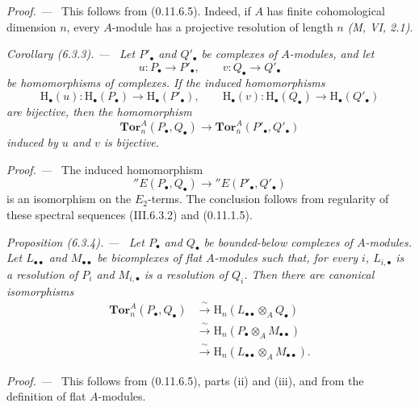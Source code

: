 \documentclass[10pt,oneside]{book}
\newcommand{\HH}{\mathrm H}
\newcommand{\sref}[2][]{(#2)}
\newenvironment{proposition}[1][]{\par\medskip\noindent\itshape Proposition (#1). ---\ }{\par}
\newenvironment{corollary}[1][]{\par\medskip\noindent\itshape Corollary (#1). ---\ }{\par}
\newenvironment{proof}{\par\medskip\noindent\textit{Proof. ---\ }}{\par}
\begin{document}
\begin{proof}
This follows from \sref[0]{0.11.6.5}.  Indeed, if $A$ has finite
cohomological dimension $n$, every $A$-module has a projective
resolution of length $n$ \emph{(M, VI, 2.1)}.
\end{proof}

\begin{corollary}[6.3.3]
\label{III.6.3.3}
Let $P'_\bullet$ and $Q'_\bullet$ be complexes of $A$-modules, and
let
\[
  u:P_\bullet\to P'_\bullet,
  \qquad
  v:Q_\bullet\to Q'_\bullet
\]
be homomorphisms of complexes.  If the induced homomorphisms
\[
  \HH_\bullet(u):
  \HH_\bullet(P_\bullet)\longrightarrow\HH_\bullet(P'_\bullet),
  \qquad
  \HH_\bullet(v):
  \HH_\bullet(Q_\bullet)\longrightarrow\HH_\bullet(Q'_\bullet)
\]
are bijective, then the homomorphism
\[
  \mathbf{Tor}_n^A(P_\bullet,Q_\bullet)
  \longrightarrow
  \mathbf{Tor}_n^A(P'_\bullet,Q'_\bullet)
\]
induced by $u$ and $v$ is bijective.
\end{corollary}

\begin{proof}
The induced homomorphism
\[
  ''E(P_\bullet,Q_\bullet)
  \longrightarrow
  ''E(P'_\bullet,Q'_\bullet)
\]
is an isomorphism on the $E_2$-terms.  The conclusion follows from
regularity of these spectral sequences \sref{III.6.3.2} and
\sref[0]{0.11.1.5}.
\end{proof}

\begin{proposition}[6.3.4]
\label{III.6.3.4}
Let $P_\bullet$ and $Q_\bullet$ be bounded-below complexes of
$A$-modules.  Let $L_{\bullet\bullet}$ and
$M_{\bullet\bullet}$ be bicomplexes of flat $A$-modules such that,
for every $i$, $L_{i,\bullet}$ is a resolution of $P_i$ and
$M_{i,\bullet}$ is a resolution of $Q_i$.  Then there are canonical
isomorphisms
\[
  \begin{split}
  \mathbf{Tor}_n^A(P_\bullet,Q_\bullet)
  &\xrightarrow{\ \sim\ }
  \HH_n(L_{\bullet\bullet}\otimes_AQ_\bullet)\\
  &\xrightarrow{\ \sim\ }
  \HH_n(P_\bullet\otimes_AM_{\bullet\bullet})\\
  &\xrightarrow{\ \sim\ }
  \HH_n(L_{\bullet\bullet}\otimes_AM_{\bullet\bullet}).
  \end{split}
  \tag{6.3.4.1}\label{III.6.3.4.1}
\]
\end{proposition}

\begin{proof}
This follows from \sref[0]{0.11.6.5}, parts (ii) and (iii), and
from the definition of flat $A$-modules.
\end{proof}
\end{document}
